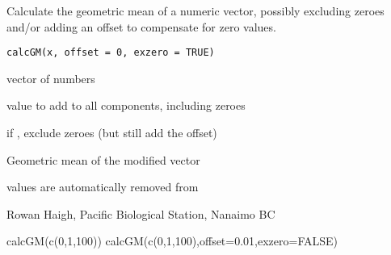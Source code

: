 \documentclass[letterpaper]{book}
\begin{document}
\begin{Description}\relax
Calculate the geometric mean of a numeric 
vector, possibly excluding zeroes and/or adding an offset 
to compensate for zero values.
\end{Description}
\begin{Usage}
\begin{verbatim}calcGM(x, offset = 0, exzero = TRUE)\end{verbatim}
\end{Usage}
\begin{Arguments}
\begin{ldescription}
\item[\code{x}] vector of numbers
\item[\code{offset}] value to add to all components, including zeroes
\item[\code{exzero}] if , exclude zeroes (but still add the offset)
\end{ldescription}
\end{Arguments}
\begin{Value}
Geometric mean of the modified vector 
\end{Value}
\begin{Note}\relax
{} values are automatically removed from 
\end{Note}
\begin{Author}\relax
Rowan Haigh, Pacific Biological Station, Nanaimo BC
\end{Author}
\begin{Examples}
\begin{ExampleCode}
calcGM(c(0,1,100))
calcGM(c(0,1,100),offset=0.01,exzero=FALSE)
\end{ExampleCode}
\end{Examples}
\end{document}
